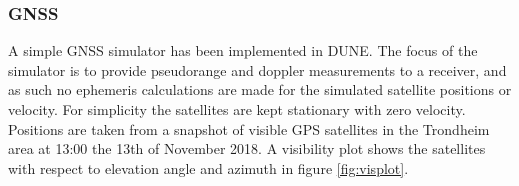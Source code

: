     
    

    \subsubsection{GNSS}
        A simple GNSS simulator has been implemented in DUNE. The focus of the simulator is to provide pseudorange and doppler measurements to a receiver, and as such no ephemeris calculations are made for the simulated satellite positions or velocity. For simplicity the satellites are kept stationary with zero velocity. Positions are taken from a snapshot of visible GPS satellites in the Trondheim area at 13:00 the 13th of November 2018. A visibility plot shows the satellites with respect to elevation angle and azimuth in figure \ref{fig:visplot}.\\

